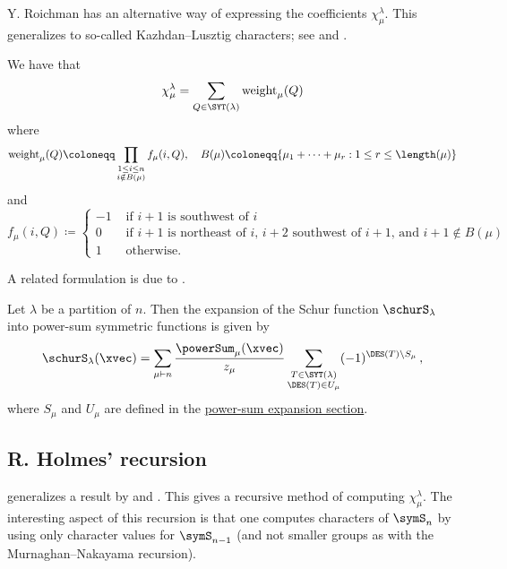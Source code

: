 Y. Roichman has an alternative way of expressing the coefficients
$\chi^{\lambda}_{\mu}$.  This generalizes to so-called
Kazhdan--Lusztig characters; see \cite{Roichman1997} and
\cite{Roichman1999}.
\begin{theorem}[Y. Roichman, 1997]
We have that
\[
\chi^{\lambda}_{\mu} = \sum_{Q \in \SYT(\lambda)} \mathrm{weight}_\mu(Q)
\]
where
\[
\mathrm{weight}_\mu(Q) \coloneqq \prod_{\substack{1 \leq i \leq n \\ i \notin B(\mu)}} f_\mu(i,Q),
\quad 
B(\mu) \coloneqq \{ \mu_1 + \dotsb + \mu_r : 1\leq r \leq \length(\mu)\}
\]
and 
\[
f_\mu(i,Q) \coloneqq \begin{cases}
-1 &\text{ if $i+1$ is southwest of $i$} \\
0  &\text{ if $i+1$ is northeast of $i$, $i+2$ southwest of $i+1$,
and $i+1 \notin B(\mu)$} \\
1  & \text{ otherwise}.
\end{cases}
\]
\end{theorem}

A related formulation is due to 
\cite[Prop.~3.2]{Athanasiadis2015}.
\begin{theorem}
Let $\lambda$ be a partition of $n$.
Then the expansion of the Schur function $\schurS_{\lambda}$ into power-sum
symmetric functions is given by
\begin{align}
\schurS_\lambda(\xvec)
=
\sum_{\mu \vdash n}
%
\frac{\powerSum_\mu(\xvec)}{z_\mu}
%
\sum_{\substack{ T \in \SYT(\lambda) \\  \DES(T) \in U_\mu }}
(-1)^{\DES(T) \setminus S_\mu}
\,,
\end{align}
where $S_\mu$ and $U_\mu$ are defined in the
\hyperref[gesselPowerSum]{power-sum expansion section}.
\end{theorem}



\subsection[holmesChi]{R. Holmes' recursion}

 \cite{Holmes2017x} generalizes a result by
 and 
\cite[Sec.~2.4.3]{JamesKerber1984}.
This gives a recursive method of computing $\chi^{\lambda}_{\mu}$.
The interesting aspect of this recursion is that one computes characters of
$\symS_n$ by using only character values for $\symS_{n-1}$
(and not smaller groups as with the Murnaghan--Nakayama recursion).

